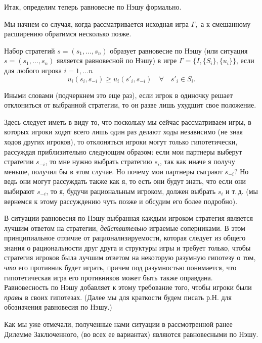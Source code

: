 \documentclass[12pt]{article}
\begin{document}
Итак, определим теперь равновесие по Нэшу формально.

Мы начнем со случая, когда рассматривается исходная игра $\Gamma,$ а
к смешанному расширению обратимся несколько позже.

\begin{definition}
Набор стратегий $s=(s_1,\ldots,s_n)$ образует  равновесие по Нэшу
(или ситуация $s=(s_1,\ldots,s_n)$ является равновесной по Нэшу) в
игре $\Gamma=\{I,\{S_i\},\{u_i\}\}$, если для любого игрока
$i=1,\ldots n$
$$
u_i(s_i,s_{-i})\ge u_i(s'_i,s_{-i})\quad\forall\quad s'_i\in S_i.
$$
\end{definition}

Иными словами (подчеркнем это еще раз), если игрок в одиночку решает
отклониться от выбранной стратегии, то он разве лишь ухудшит свое
положение.

Здесь следует иметь в виду то, что поскольку мы сейчас рассматриваем
игры, в которых игроки ходят всего лишь один раз делают ходы
независимо (не зная ходов других игроков), то отклоняться игроки
могут только гипотетически, рассуждая приблизительно следующим
образом: если мои партнеры выберут стратегии $s_{-i}$, то мне нужно
выбрать стратегию $s_i$, так как иначе я получу меньше, получил бы в
этом случае. Но почему мои партнеры сыграют $s_{-i}$? Но ведь они
могут рассуждать также как я, то есть они будут знать, что если они
выбирают $s_{-i}$, то я, будучи рациональным игроком, должен выбрать
$s_i$ и т.\,д. (мы вернемся к этому рассуждению чуть позже и обсудим
его более подробно).

В ситуации равновесия по Нэшу выбранная каждым игроком стратегия
является лучшим ответом на стратегии, {\it  действительно} играемые
соперниками. В этом принципиальное отличие от рационализируемости,
которая следует из общего знания о рациональности друг друга и
структуры игры и требует только, чтобы стратегия игроков была лучшим
ответом на некоторую разумную гипотезу о том, \emph{что} его
противник будет играть, причем под разумностью понимается, что
гипотетическая игра его противников может быть также оправдана.
Равновесность по Нэшу добавляет к этому требование того, чтобы
игроки были {\it правы}  в своих гипотезах. (Далее мы для краткости
будем писать р.Н. для обозначения равновесия по Нэшу.)

Как мы уже отмечали, полученные нами ситуации в рассмотренной ранее
Дилемме Заключенного, (во всех ее вариантах) являются равновесными
по Нэшу.
\smallskip
\end{document}

